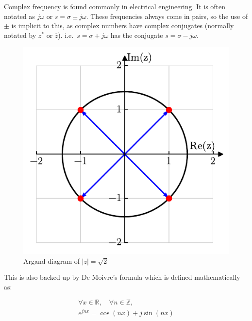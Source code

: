 \documentclass[
  12pt,
  a4paper,
]{report}
\begin{document}
\label{topic3}
Complex frequency is found commonly in electrical engineering. It is
often notated as \(j\omega\) or \(s = \sigma \pm j\omega\). These
frequencies always come in pairs, so the use of \(\pm\) is implicit to
this, as complex numbers have complex conjugates (normally notated by
\(z^*\) or \(\bar{z}\)). i.e.~\(s = \sigma + j\omega\) has the conjugate
\(s=\sigma - j\omega\).

\label{argand-figure}
\begin{figure}

{\centering \includegraphics{chapters/module1/topic3_comp_freq_files/figure-pdf/argand-output-1.pdf}

}

\caption{Argand diagram of \(|z| = \sqrt{2}\)}

\end{figure}%

\label{de-moivre-formula}
This is also backed up by De Moivre's formula which is defined
mathematically as:

\begin{gather}
    \label{eq:de-moivre-formula}
    \forall x \in \mathbb{R}, \quad \forall n \in \mathbb{Z}, \\
    e^{jnx} = \cos(n x) + j \sin(n x)  
\end{gather}
\end{document}
